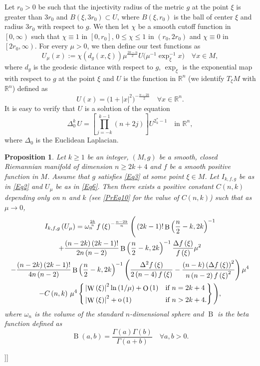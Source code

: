 \documentclass[reqno]{amsart}
\numberwithin{equation}{section}
\DeclareMathOperator{\Weyl}{W}
\DeclareMathOperator{\Beta}{B}
\DeclareMathOperator{\bigO}{O}
\DeclareMathOperator{\smallo}{o}
\newcommand{\R}{\mathbb{R}}
\newcommand{\<}{\left<}
\renewcommand{\>}{\right>}
\renewcommand{\[}{\left[}
\renewcommand{\]}{\right]}
\renewcommand{\(}{\left(}
\renewcommand{\)}{\right)}
\newtheorem{proposition}{Proposition}[section]
\begin{document}
Let $r_0>0$ be such that the injectivity radius of the metric $g$ at the point $\xi$ is greater than $3r_0$ and $B\(\xi,3r_0\)\subset U$, where $B\(\xi,r_0\)$ is the ball of center $\xi$ and radius $3r_0$ with respect to $g$. We then let $\chi$ be a smooth cutoff function in $\[0,\infty\)$ such that $\chi\equiv1$ in $\[0,r_0\]$, $0\le\chi\le1$ in $\(r_0,2r_0\)$ and $\chi\equiv0$ in $\[2r_0,\infty\)$. For every $\mu>0$, we then define our test functions as
\begin{equation}\label{Eq6}
U_\mu\(x\):=\chi\(d_g\(x,\xi\)\)\mu^{\frac{2k-n}{2}}U\big(\mu^{-1}\exp_\xi^{-1}x\big)\quad\forall x\in M,
\end{equation}
where $d_g$ is the geodesic distance with respect to $g$, $\exp_\xi$ is the exponential map with respect to $g$ at the point $\xi$ and $U$ is the function in $\R^n$ (we identify $T_\xi M$ with $\R^n$) defined as
$$U\(x\)=\big(1+\left|x\right|^2\big)^{-\frac{n-2k}{2}}\quad\forall x\in\R^n.$$
It is easy to verify that $U$ is a solution of the equation 
$$\Delta_0^k\,U=\[\prod_{j=-k}^{k-1}\(n+2j\)\]U^{2^*_k-1}\quad\text{in }\R^n,$$
where $\Delta_0$ is the Euclidean Laplacian.

\begin{proposition}\label{Pr}
Let $k\ge1$ be an integer, $\(M,g\)$ be a smooth, closed Riemannian manifold of dimension $n\ge 2k+4$ and $f$ be a smooth positive function in $M$. Assume that $g$ satisfies \eqref{Eq3} at some point $\xi\in M$. Let $I_{k,f,g}$ be as in \eqref{Eq2} and $U_\mu$ be as in \eqref{Eq6}. Then there exists a positive constant $C\(n,k\)$ depending only on $n$ and $k$ (see \eqref{PrEq10} for the value of $C\(n,k\)$) such that as $\mu\to0$,
\begin{multline}\label{PrEq1}
I_{k,f,g}\(U_\mu\)=\omega_n^{\frac{2k}{n}}f\(\xi\)^{-\frac{n-2k}{n}}\Bigg(\(2k-1\)!\Beta\(\frac{n}{2}-k,2k\)^{-1}\\
+\frac{\(n-2k\)\(2k-1\)!}{2n\(n-2\)}\Beta\(\frac{n}{2}-k,2k\)^{-1}\frac{\Delta f\(\xi\)}{f\(\xi\)}\mu^2\allowdisplaybreaks\\
-\frac{\(n-2k\)\(2k-1\)!}{4n\(n-2\)}\Beta\(\frac{n}{2}-k,2k\)^{-1}\(\frac{\Delta^2f\(\xi\)}{2\(n-4\)f\(\xi\)}-\frac{\(n-k\)\(\Delta f\(\xi\)\)^2}{n\(n-2\)f\(\xi\)^2}\)\mu^4\\
-C\(n,k\)\,\mu^4\left\{\begin{aligned}&\left|\Weyl\(\xi\)\right|^2\ln\(1/\mu\)+\bigO\(1\)&&\text{if }n=2k+4\\&\left|\Weyl\(\xi\)\right|^2+\smallo\(1\)&&\text{if }n>2k+4.\end{aligned}\right\}\Bigg),
\end{multline}
where $\omega_n$ is the volume of the standard $n$-dimensional sphere and $\Beta$ is the beta function defined as 
$$\Beta\(a,b\)=\frac{\Gamma\(a\)\Gamma\(b\)}{\Gamma\(a+b\)}\quad\forall a,b>0.$$
\end{proposition}

\]\]
\end{document}
